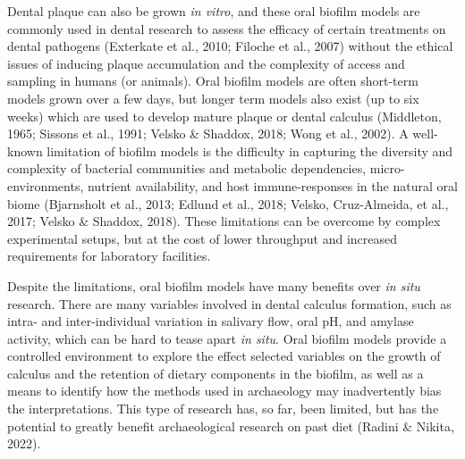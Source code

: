 \documentclass[
]{article}
\begin{document}
Dental plaque can also be grown \emph{in vitro}, and these oral biofilm
models are commonly used in dental research to assess the efficacy of
certain treatments on dental pathogens (Exterkate et al., 2010; Filoche
et al., 2007) without the ethical issues of inducing plaque accumulation
and the complexity of access and sampling in humans (or animals). Oral
biofilm models are often short-term models grown over a few days, but
longer term models also exist (up to six weeks) which are used to
develop mature plaque or dental calculus (Middleton, 1965; Sissons et
al., 1991; Velsko \& Shaddox, 2018; Wong et al., 2002). A well-known
limitation of biofilm models is the difficulty in capturing the
diversity and complexity of bacterial communities and metabolic
dependencies, micro-environments, nutrient availability, and host
immune-responses in the natural oral biome (Bjarnsholt et al., 2013;
Edlund et al., 2018; Velsko, Cruz-Almeida, et al., 2017; Velsko \&
Shaddox, 2018). These limitations can be overcome by complex
experimental setups, but at the cost of lower throughput and increased
requirements for laboratory facilities.

Despite the limitations, oral biofilm models have many benefits over
\emph{in situ} research. There are many variables involved in dental
calculus formation, such as intra- and inter-individual variation in
salivary flow, oral pH, and amylase activity, which can be hard to tease
apart \emph{in situ}. Oral biofilm models provide a controlled
environment to explore the effect selected variables on the growth of
calculus and the retention of dietary components in the biofilm, as well
as a means to identify how the methods used in archaeology may
inadvertently bias the interpretations. This type of research has, so
far, been limited, but has the potential to greatly benefit
archaeological research on past diet (Radini \& Nikita, 2022).
\end{document}
